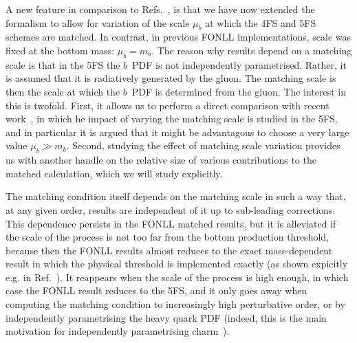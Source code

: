 \documentclass[12pt]{article}
\begin{document}
A new feature  in comparison to
Refs.~\cite{Forte:2015hba,Forte:2016sja},
is that we have now extended the formalism to allow for variation of
the scale $\mu_b$ at which the 4FS and 5FS schemes are matched.
In contrast,  in previous FONLL implementations, scale was fixed at
the  bottom mass:  $\mu_b=m_b$.
The reason why results depend on a matching scale is that in 
the 5FS the $b$~PDF is not independently
parametrised. Rather, it is assumed that it is radiatively generated
by the gluon. The matching scale is then the scale at which the $b$~PDF
is determined from the gluon. 
The interest in this is twofold. First,  it allows us
to perform  a direct comparison with recent work~\cite{Bertone:2017djs},
in which  he impact of varying the matching scale  is studied in the
5FS,  and in particular it is argued  that it might be
advantagous to choose a very large value $\mu_b\gg m_b$. 
Second, studying the effect  of matching scale variation provides us 
with another handle on the relative size of various contributions to
the matched calculation, which we will study explicitly.

The matching condition itself depends on
the matching scale in such a way that, at any given order,  results
are  independent of it up to sub-leading corrections. This dependence
persists in the FONLL matched results, but it is alleviated if the
scale of the process is  not too far from the bottom production
threshold, because then
the FONLL results almost reduces to the exact mass-dependent result in
which the physical threshold is implemented exactly (as shown
expicitly e.g. in Ref.~\cite{Forte:2010ta}). It reappears when
the scale of the process is 
high enough, in which case  the FONLL result reduces to the 5FS, and it
only goes away when computing the matching condition to increasingly
high perturbative order, or by independently parametrising the heavy
quark PDF (indeed, this is the main motivation for independently
parametrising charm~\cite{Ball:2016neh,Ball:2017nwa}).
\end{document}
